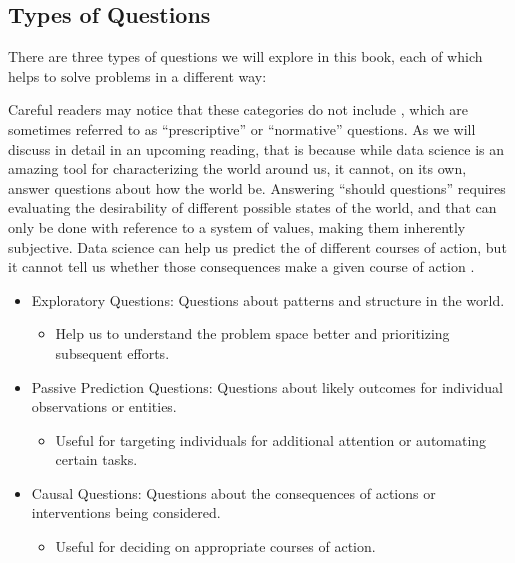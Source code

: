 \documentclass[letterpaper,10pt,english]{jupyterBook}
\begin{document}
\subsection{Types of Questions}
\label{\detokenize{10_introduction/22_question_types:types-of-questions}}
\sphinxAtStartPar
There are three types of questions we will explore in this book, each of which helps to solve problems in a different way:%
\begin{footnote}[1]\sphinxAtStartFootnote
Careful readers may notice that these categories do not include , which are sometimes referred to as “prescriptive” or “normative” questions. As we will discuss in detail in an upcoming reading, that is because while data science is an amazing tool for characterizing the world around us, it cannot, on its own, answer questions about how the world  be. Answering “should questions” requires evaluating the desirability of different possible states of the world, and that can only be done with reference to a system of values, making them inherently subjective. Data science can help us predict the  of different courses of action, but it cannot tell us whether those consequences make a given course of action .
%
\end{footnote}
\begin{itemize}
\item {} 
\sphinxAtStartPar
Exploratory Questions: Questions about patterns and structure in the world.
\begin{itemize}
\item {} 
\sphinxAtStartPar
Help us to understand the problem space better and prioritizing subsequent efforts.

\end{itemize}

\item {} 
\sphinxAtStartPar
Passive Prediction Questions: Questions about likely outcomes for individual observations or entities.
\begin{itemize}
\item {} 
\sphinxAtStartPar
Useful for targeting individuals for additional attention or automating certain tasks.

\end{itemize}

\item {} 
\sphinxAtStartPar
Causal Questions: Questions about the consequences of actions or interventions being considered.
\begin{itemize}
\item {} 
\sphinxAtStartPar
Useful for deciding on appropriate courses of action.

\end{itemize}

\end{itemize}
\end{document}
